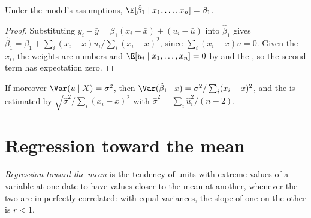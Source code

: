 \begin{proposition}[Unbiasedness]\label{prop:b1:simple-regression:unbiased}
Under the model's assumptions, $\E[\hat\beta_1 \mid x_1, \dots, x_n] = \beta_1$.
\end{proposition}

\begin{proof}
Substituting $y_i - \bar y = \beta_1(x_i - \bar x) + (u_i - \bar u)$ into $\hat\beta_1$ gives
$\hat\beta_1 = \beta_1 + \sum_i (x_i - \bar x)u_i / \sum_i (x_i - \bar x)^2$, since $\sum_i (x_i - \bar x)\bar u = 0$. Given the $x_i$, the
weights are numbers and $\E[u_i \mid x_1, \dots, x_n] = 0$ by  and the , so the second term has expectation zero.
\end{proof}

\begin{proposition}\label{prop:b1:simple-regression:se}
If moreover $\Var(u \mid X) = \sigma^2$, then $\Var(\hat\beta_1 \mid x) = \sigma^2/\sum_i (x_i - \bar x)^2$, and the  is
estimated by $\sqrt{\hat\sigma^2/\sum_i (x_i - \bar x)^2}$ with $\hat\sigma^2 = \sum_i \hat u_i^2/(n - 2)$.
\end{proposition}


\label{lst:b1:simple-regression:se}

\label{out:b1:simple-regression:se}

\section{Regression toward the mean}\label{sec:b1:simple-regression:toward}

\begin{definition}\label{def:b1:simple-regression:toward-mean}
\emph{Regression toward the mean} is the tendency of units with extreme values of a
variable at one date to have values closer to the mean at another, whenever
the two are imperfectly correlated: with equal variances, the slope of one
on the other is $r < 1$.
\end{definition}

